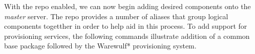With the \FSP{} repo enabled, we can now begin adding desired components onto the
{\em master} server. The \FSP{} repo provides a number of aliases that group
logical components togetther in order to help aid in this process. To add
support for provisioning services, the following commands illustrate addition
of a common base package followed by the Warewulf* provisioning system.
